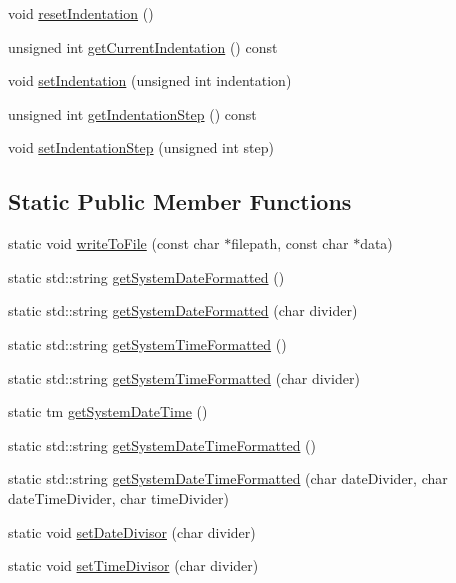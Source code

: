 \begin{DoxyCompactItemize}
\item 
void \mbox{\hyperlink{classec_1_1_file_logger_af440c1355b7bd328e2ffe80693e3a0dd}{reset\+Indentation}} ()
\item 
unsigned int \mbox{\hyperlink{classec_1_1_file_logger_aeeb845fd49ea3115ed2e49e168aa8598}{get\+Current\+Indentation}} () const
\item 
void \mbox{\hyperlink{classec_1_1_file_logger_ad888166c84976fb4a55bce66353794ac}{set\+Indentation}} (unsigned int indentation)
\item 
unsigned int \mbox{\hyperlink{classec_1_1_file_logger_a8b4a54230f9489ef8ed8e8263b9b1b45}{get\+Indentation\+Step}} () const
\item 
void \mbox{\hyperlink{classec_1_1_file_logger_a6cb27f98d09cf31cea3e5663acb13d93}{set\+Indentation\+Step}} (unsigned int step)
\end{DoxyCompactItemize}
\subsection*{Static Public Member Functions}
\begin{DoxyCompactItemize}
\item 
static void \mbox{\hyperlink{classec_1_1_file_logger_a834c7fef56181f49afd88657fe2162fe}{write\+To\+File}} (const char $\ast$filepath, const char $\ast$data)
\item 
static std\+::string \mbox{\hyperlink{classec_1_1_file_logger_a91177b4e05f5e8f375ae34ad76092fdc}{get\+System\+Date\+Formatted}} ()
\item 
static std\+::string \mbox{\hyperlink{classec_1_1_file_logger_a182f2ec8517c6e70372b8ecb6bfe14ab}{get\+System\+Date\+Formatted}} (char divider)
\item 
static std\+::string \mbox{\hyperlink{classec_1_1_file_logger_a001c46d5efb653bb1aac6d2e913429bc}{get\+System\+Time\+Formatted}} ()
\item 
static std\+::string \mbox{\hyperlink{classec_1_1_file_logger_ada4787b3df30e5c2e493bf15583dd6c1}{get\+System\+Time\+Formatted}} (char divider)
\item 
static tm \mbox{\hyperlink{classec_1_1_file_logger_ad001a6bbba22379dc6bf4d5ad7e36aaf}{get\+System\+Date\+Time}} ()
\item 
static std\+::string \mbox{\hyperlink{classec_1_1_file_logger_a3229fdb481db685c23acced687a766a6}{get\+System\+Date\+Time\+Formatted}} ()
\item 
static std\+::string \mbox{\hyperlink{classec_1_1_file_logger_a937c7a533571ef4c157c6a8037044466}{get\+System\+Date\+Time\+Formatted}} (char date\+Divider, char date\+Time\+Divider, char time\+Divider)
\item 
static void \mbox{\hyperlink{classec_1_1_file_logger_a8e8d1d7c8f274ee930f4ae9bf509343b}{set\+Date\+Divisor}} (char divider)
\item 
static void \mbox{\hyperlink{classec_1_1_file_logger_a4ea3c43bdea87979d69f8f3ff1496259}{set\+Time\+Divisor}} (char divider)
\end{DoxyCompactItemize}


